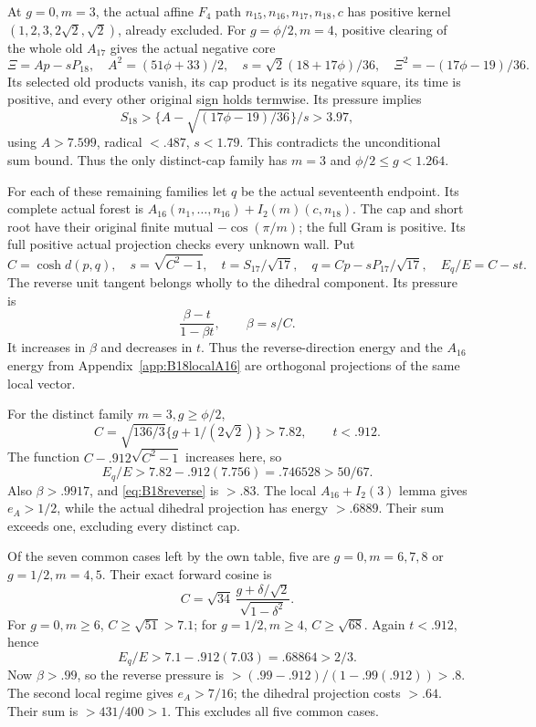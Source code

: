 \documentclass[11pt]{article}
\theoremstyle{definition}
\theoremstyle{remark}
\begin{document}
At \(g=0,m=3\), the actual affine \(F_4\) path
\(n_{15},n_{16},n_{17},n_{18},c\) has positive kernel
\((1,2,3,2\sqrt2,\sqrt2)\), already excluded.
For \(g=\phi/2,m=4\), positive clearing of the whole old
\(A_{17}\) gives the actual negative core
\[
 \Xi=Ap-sP_{18},\quad
 A^2=(51\phi+33)/2,\quad s=\sqrt2(18+17\phi)/36,\quad
 \Xi^2=-(17\phi-19)/36 .
\]
Its selected old products vanish, its cap product is its negative
square, its time is positive, and every other original sign holds
termwise. Its pressure implies
\[
 S_{18}>\{A-\sqrt{(17\phi-19)/36}\}/s>3.97,
\]
using \(A>7.599\), radical \(<.487\), \(s<1.79\).
This contradicts the unconditional sum bound.
Thus the only distinct-cap family has \(m=3\) and
\(\phi/2\leq g<1.264\).

For each of these remaining families let \(q\) be the actual
seventeenth endpoint. Its complete actual forest is
\(A_{16}(n_1,\ldots,n_{16})+I_2(m)(c,n_{18})\).
The cap and short root have their original finite mutual
\(-\cos(\pi/m)\); the full Gram is positive.
Its full positive actual projection checks every unknown wall.
Put
\[
 C=\cosh d(p,q),\quad s=\sqrt{C^2-1},\quad
 t=S_{17}/\sqrt{17},\quad
 q=Cp-sP_{17}/\sqrt{17},\quad E_q/E=C-st .
\]
The reverse unit tangent belongs wholly to the dihedral component.
Its pressure is
\begin{equation}\label{eq:B18reverse}
 \frac{\beta-t}{1-\beta t},\qquad \beta=s/C .
\end{equation}
It increases in \(\beta\) and decreases in \(t\).
Thus the reverse-direction energy and the \(A_{16}\) energy
from Appendix~\ref{app:B18localA16} are orthogonal projections
of the same local vector.

For the distinct family \(m=3,g\geq\phi/2\),
\[
 C=\sqrt{136/3}\{g+1/(2\sqrt2)\}>7.82,\qquad t<.912.
\]
The function \(C-.912\sqrt{C^2-1}\) increases here, so
\[
 E_q/E>7.82-.912(7.756)=.746528>50/67 .
\]
Also \(\beta>.9917\), and \eqref{eq:B18reverse} is \(>.83\).
The local \(A_{16}+I_2(3)\) lemma gives \(e_A>1/2\), while
the actual dihedral projection has energy \(>.6889\).
Their sum exceeds one, excluding every distinct cap.

Of the seven common cases left by the own table, five are
\(g=0,m=6,7,8\) or \(g=1/2,m=4,5\).
Their exact forward cosine is
\[
 C=\sqrt{34}\,\frac{g+\delta/\sqrt2}{\sqrt{1-\delta^2}} .
\]
For \(g=0,m\geq6\), \(C\geq\sqrt{51}>7.1\);
for \(g=1/2,m\geq4\), \(C\geq\sqrt{68}\).
Again \(t<.912\), hence
\[
 E_q/E>7.1-.912(7.03)=.68864>2/3 .
\]
Now \(\beta>.99\), so the reverse pressure is
\(>(.99-.912)/(1-.99(.912))>.8\).
The second local regime gives \(e_A>7/16\); the dihedral
projection costs \(>.64\). Their sum is \(>431/400>1\).
This excludes all five common cases.
\end{document}
